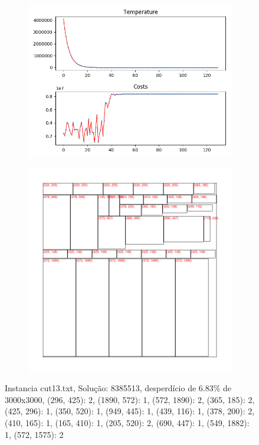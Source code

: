 \begin{figure}
\centering
\begin{subfigure}{.5\textwidth}
  \centering
  \includegraphics[width=1\linewidth]{results/cut13/1/plot}
  \label{fig:sub1}
\end{subfigure}%
\begin{subfigure}{.5\textwidth}
  \centering
  \includegraphics[width=1\linewidth]{results/cut13/1/cut}
  \label{fig:sub2}
\end{subfigure}
\caption{Instancia cut13.txt, Solução: 8385513, desperdício de 6.83\% de 3000x3000, {(296, 425): 2, (1890, 572): 1, (572, 1890): 2, (365, 185): 2, (425, 296): 1, (350, 520): 1, (949, 445): 1, (439, 116): 1, (378, 200): 2, (410, 165): 1, (165, 410): 1, (205, 520): 2, (690, 447): 1, (549, 1882): 1, (572, 1575): 2}}
\label{fig:test}
\end{figure}


